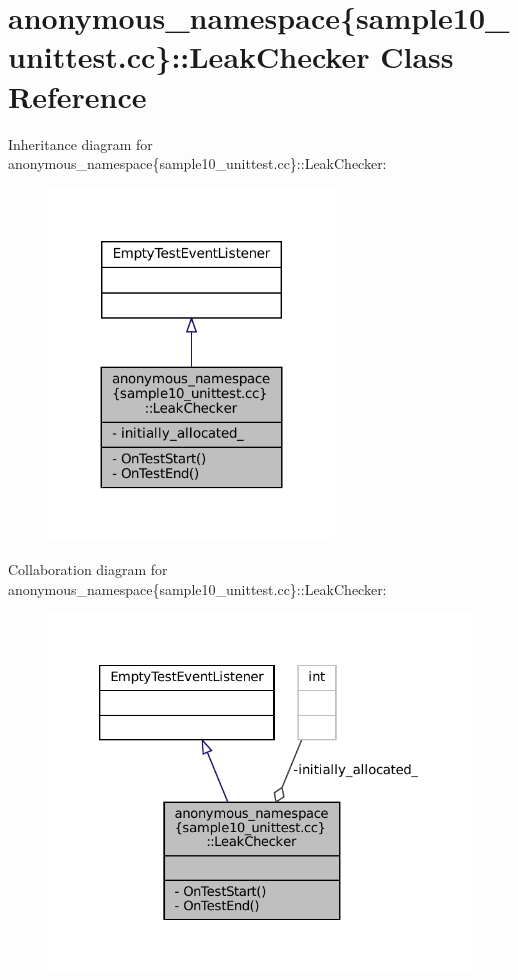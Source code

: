 \hypertarget{classanonymous__namespace_02sample10__unittest_8cc_03_1_1LeakChecker}{}\section{anonymous\+\_\+namespace\{sample10\+\_\+unittest.\+cc\}\+:\+:Leak\+Checker Class Reference}
\label{classanonymous__namespace_02sample10__unittest_8cc_03_1_1LeakChecker}


Inheritance diagram for anonymous\+\_\+namespace\{sample10\+\_\+unittest.\+cc\}\+:\+:Leak\+Checker\+:
\nopagebreak
\begin{figure}[H]
\begin{center}
\leavevmode
\includegraphics[width=215pt]{classanonymous__namespace_02sample10__unittest_8cc_03_1_1LeakChecker__inherit__graph}
\end{center}
\end{figure}


Collaboration diagram for anonymous\+\_\+namespace\{sample10\+\_\+unittest.\+cc\}\+:\+:Leak\+Checker\+:
\nopagebreak
\begin{figure}[H]
\begin{center}
\leavevmode
\includegraphics[width=326pt]{classanonymous__namespace_02sample10__unittest_8cc_03_1_1LeakChecker__coll__graph}
\end{center}
\end{figure}
